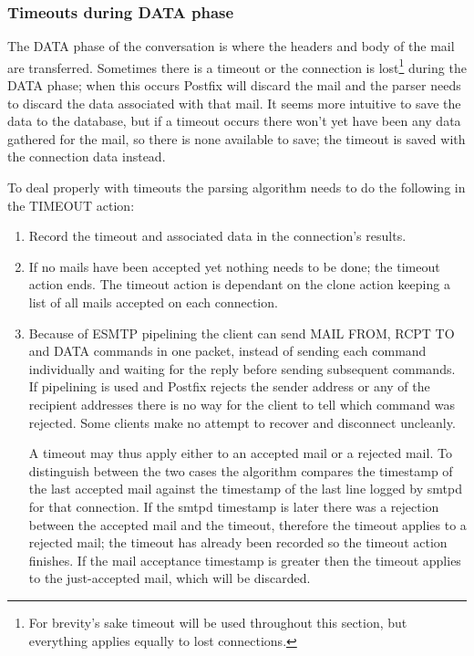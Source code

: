 \documentclass[a4paper,12pt,draft]{article}
\begin{document}
\subsubsection{Timeouts during DATA phase}

\label{timeouts-during-data-phase}

The DATA phase of the \SMTP{} conversation is where the headers and body of
the mail are transferred.  Sometimes there is a timeout or the connection
is lost\footnote{For brevity's sake timeout will be used throughout this
section, but everything applies equally to lost connections.} during the
DATA phase; when this occurs Postfix will discard the mail and the parser
needs to discard the data associated with that mail.  It seems more
intuitive to save the data to the database, but if a timeout occurs there
won't yet have been any data gathered for the mail, so there is none
available to save; the timeout is saved with the connection data instead.

To deal properly with timeouts the parsing algorithm needs to do the
following in the TIMEOUT action:

\begin{enumerate}

    \item Record the timeout and associated data in the connection's
        results.

    \item If no mails have been accepted yet nothing needs to be done; the
        timeout action ends.  The timeout action is dependant on the clone
        action keeping a list of all mails accepted on each connection.

    \item Because of ESMTP pipelining the client can send MAIL FROM, RCPT
        TO and DATA commands in one packet, instead of sending each command
        individually and waiting for the reply before sending subsequent
        commands.  If pipelining is used and Postfix rejects the sender
        address or any of the recipient addresses there is no way for the
        client to tell which command was rejected.  Some clients make no
        attempt to recover and disconnect uncleanly.

        A timeout may thus apply either to an accepted mail or a rejected
        mail.  To distinguish between the two cases the algorithm compares
        the timestamp of the last accepted mail against the timestamp of
        the last line logged by smtpd for that connection.  If the smtpd
        timestamp is later there was a rejection between the accepted mail
        and the timeout, therefore the timeout applies to a rejected mail;
        the timeout has already been recorded so the timeout action
        finishes.  If the mail acceptance timestamp is greater then the
        timeout applies to the just-accepted mail, which will be discarded.

\end{enumerate}
\end{document}
